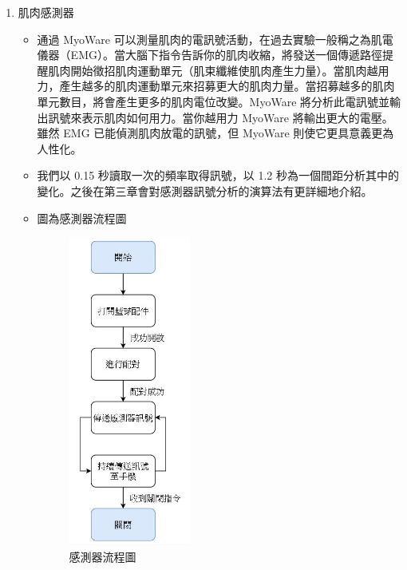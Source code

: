 \documentclass[12pt]{article}  %
\theoremstyle{plain}
\begin{document}
\begin{enumerate}
\item 肌肉感測器
\begin{itemize}
\item 通過 MyoWare 可以測量肌肉的電訊號活動，在過去實驗一般稱之為肌電儀器（EMG）。當大腦下指令告訴你的肌肉收縮，將發送一個傳遞路徑提醒肌肉開始徵招肌肉運動單元（肌束纖維使肌肉產生力量）。當肌肉越用力，產生越多的肌肉運動單元來招募更大的肌肉力量。當招募越多的肌肉單元數目，將會產生更多的肌肉電位改變。MyoWare 將分析此電訊號並輸出訊號來表示肌肉如何用力。當你越用力 MyoWare 將輸出更大的電壓。雖然 EMG 已能偵測肌肉放電的訊號，但 MyoWare 則使它更具意義更為人性化。
\item 我們以 0.15 秒讀取一次的頻率取得訊號，以 1.2 秒為一個間距分析其中的變化。之後在第三章會對感測器訊號分析的演算法有更詳細地介紹。
\item 圖為感測器流程圖
\begin{figure}[h]  %
\centering
\includegraphics[width=4cm]{pic/ch2/感測器流程圖.JPG}
\caption{感測器流程圖}
\end{figure}
\end{itemize}


\end{enumerate}
\end{document}
